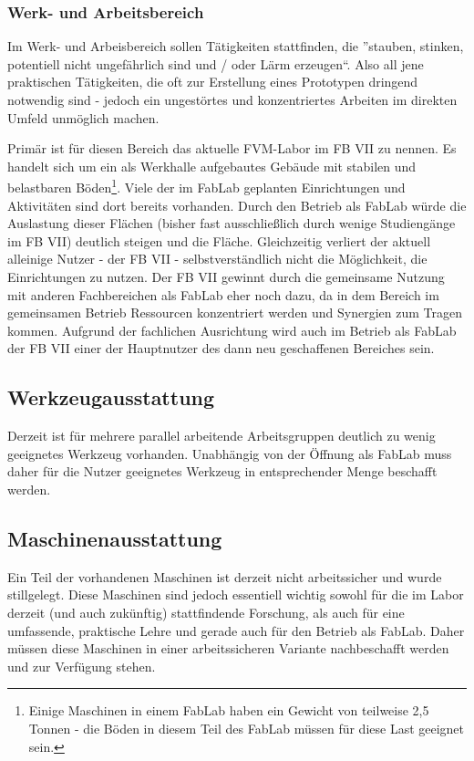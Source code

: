 \documentclass[parskip=half,headsepline,footsepline,titlepage]{scrartcl}
\begin{document}
\subsubsection{Werk- und Arbeitsbereich}
Im Werk- und Arbeisbereich sollen Tätigkeiten stattfinden, die ''stauben, stinken, potentiell nicht ungefährlich sind und / oder Lärm erzeugen``. Also all jene praktischen Tätigkeiten, die oft zur Erstellung eines Prototypen dringend notwendig sind - jedoch ein ungestörtes und konzentriertes Arbeiten im direkten Umfeld unmöglich machen.


Primär ist für diesen Bereich das aktuelle FVM-Labor im FB VII zu nennen. Es handelt sich um ein als Werkhalle aufgebautes Gebäude mit stabilen und belastbaren Böden\footnote{Einige Maschinen in einem FabLab haben ein Gewicht von teilweise 2,5 Tonnen - die Böden in diesem Teil des FabLab müssen für diese Last geeignet sein.}. Viele der im FabLab geplanten Einrichtungen und Aktivitäten sind dort bereits vorhanden. Durch den Betrieb als FabLab würde die Auslastung dieser Flächen (bisher fast ausschließlich durch wenige Studiengänge im FB VII) deutlich steigen und die Fläche. Gleichzeitig verliert der aktuell alleinige Nutzer - der FB VII - selbstverständlich nicht die Möglichkeit, die Einrichtungen zu nutzen. Der FB VII gewinnt durch die gemeinsame Nutzung mit anderen Fachbereichen als FabLab eher noch dazu, da in dem Bereich im gemeinsamen Betrieb Ressourcen konzentriert werden und Synergien zum Tragen kommen. Aufgrund der fachlichen Ausrichtung wird auch im Betrieb als FabLab der FB VII einer der Hauptnutzer des dann neu geschaffenen Bereiches sein.

\subsection{Werkzeugausstattung}
Derzeit ist für mehrere parallel arbeitende Arbeitsgruppen deutlich zu wenig geeignetes Werkzeug vorhanden. Unabhängig von der Öffnung als FabLab muss daher für die Nutzer geeignetes Werkzeug in entsprechender Menge beschafft werden.

\subsection{Maschinenausstattung}
Ein Teil der vorhandenen Maschinen ist derzeit nicht arbeitssicher und wurde stillgelegt. Diese Maschinen sind jedoch essentiell wichtig sowohl für die im Labor derzeit (und auch zukünftig) stattfindende Forschung, als auch für eine umfassende, praktische Lehre und gerade auch für den Betrieb als FabLab. Daher müssen diese Maschinen in einer arbeitssicheren Variante nachbeschafft werden und zur Verfügung stehen.
\end{document}
